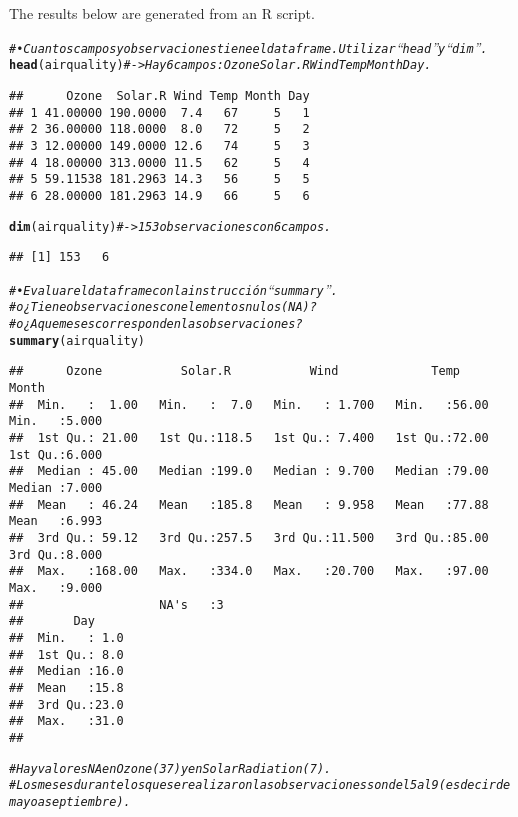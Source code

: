\documentclass{article}\usepackage[]{graphicx}\usepackage[]{xcolor}
\makeatletter
\newcommand{\hlcom}[1]{\textcolor[rgb]{0.678,0.584,0.686}{\textit{#1}}}%
\newcommand{\hlstd}[1]{\textcolor[rgb]{0.345,0.345,0.345}{#1}}%
\newcommand{\hlkwd}[1]{\textcolor[rgb]{0.737,0.353,0.396}{\textbf{#1}}}%
\newenvironment{kframe}{%
 \def\at@end@of@kframe{}%
 \ifinner\ifhmode%
  \def\at@end@of@kframe{\end{minipage}}%
  \begin{minipage}{\columnwidth}%
 \fi\fi%
 \def\FrameCommand##1{\hskip\@totalleftmargin \hskip-\fboxsep
 \colorbox{shadecolor}{##1}\hskip-\fboxsep
     \hskip-\linewidth \hskip-\@totalleftmargin \hskip\columnwidth}%
 \MakeFramed {\advance\hsize-\width
   \@totalleftmargin\z@ \linewidth\hsize
   \@setminipage}}%
 {\par\unskip\endMakeFramed%
 \at@end@of@kframe}
\newenvironment{knitrout}{}{} %
\makeatother
\begin{document}
The results below are generated from an R script.

\begin{knitrout}
\color{fgcolor}\begin{kframe}
\begin{alltt}
\hlcom{# •	Cuantos campos y observaciones tiene el dataframe.  Utilizar “head” y “dim”.}
\hlkwd{head}\hlstd{(airquality)} \hlcom{# -> Hay 6 campos: Ozone Solar.R Wind Temp Month Day.}
\end{alltt}
\begin{verbatim}
##      Ozone  Solar.R Wind Temp Month Day
## 1 41.00000 190.0000  7.4   67     5   1
## 2 36.00000 118.0000  8.0   72     5   2
## 3 12.00000 149.0000 12.6   74     5   3
## 4 18.00000 313.0000 11.5   62     5   4
## 5 59.11538 181.2963 14.3   56     5   5
## 6 28.00000 181.2963 14.9   66     5   6
\end{verbatim}
\begin{alltt}
\hlkwd{dim}\hlstd{(airquality)}  \hlcom{# -> 153 observaciones con 6 campos.}
\end{alltt}
\begin{verbatim}
## [1] 153   6
\end{verbatim}
\begin{alltt}
\hlcom{# •	Evaluar el dataframe con la instrucción “summary”.}
\hlcom{#     o	¿Tiene observaciones con elementos nulos (NA)?}
\hlcom{#     o	¿A que meses corresponden las observaciones?}
\hlkwd{summary}\hlstd{(airquality)}
\end{alltt}
\begin{verbatim}
##      Ozone           Solar.R           Wind             Temp           Month      
##  Min.   :  1.00   Min.   :  7.0   Min.   : 1.700   Min.   :56.00   Min.   :5.000  
##  1st Qu.: 21.00   1st Qu.:118.5   1st Qu.: 7.400   1st Qu.:72.00   1st Qu.:6.000  
##  Median : 45.00   Median :199.0   Median : 9.700   Median :79.00   Median :7.000  
##  Mean   : 46.24   Mean   :185.8   Mean   : 9.958   Mean   :77.88   Mean   :6.993  
##  3rd Qu.: 59.12   3rd Qu.:257.5   3rd Qu.:11.500   3rd Qu.:85.00   3rd Qu.:8.000  
##  Max.   :168.00   Max.   :334.0   Max.   :20.700   Max.   :97.00   Max.   :9.000  
##                   NA's   :3                                                       
##       Day      
##  Min.   : 1.0  
##  1st Qu.: 8.0  
##  Median :16.0  
##  Mean   :15.8  
##  3rd Qu.:23.0  
##  Max.   :31.0  
## 
\end{verbatim}
\begin{alltt}
\hlcom{# Hay valores NA en Ozone (37) y en Solar Radiation (7).}
\hlcom{# Los meses durante los que se realizaron las observaciones son del 5 al 9 (es decir de mayo a septiembre).}


\end{alltt}
\end{kframe}
\end{knitrout}
\end{document}

